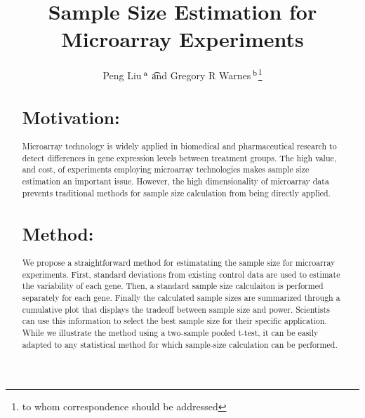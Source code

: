 \documentclass{bioinfo}
\begin{document}

\title{Sample Size Estimation for Microarray Experiments} 
\author{
  Peng Liu\,$^{\rm a}$ \t 
  and
  Gregory R Warnes\,$^{\rm b}$\footnote{to whom correspondence should
    be addressed}
}
\address{
  $^{\rm a}$Department of Biological Statistics and Computational
  Biology, Cornell University, Ithaca, NY 14853 \\
  $^{\rm b}$Nonclinical Statistics, Pfizer Global Research and Development, 
  Groton, CT 06340
}

\maketitle

\begin{abstract}

\section{Motivation:}
Microarray technology is widely applied in biomedical and
pharmaceutical research to detect differences in gene expression
levels between treatment groups.  The high value, and cost, of
experiments employing microarray technologies makes sample size
estimation an important issue.  However, the high dimensionality of
microarray data prevents traditional methods for sample size
calculation from being directly applied.

\section{Method:}
We propose a straightforward method for estimatating the sample size
for microarray experiments. First, standard deviations from existing
control data are used to estimate the variability of each gene. Then,
a standard sample size calculaiton is performed separately for each
gene.  Finally the calculated sample sizes are summarized through a
cumulative plot that displays the tradeoff between sample size and
power.  Scientists can use this information to select the best sample
size for their specific application.  While we illustrate the method
using a two-sample pooled t-test, it can be easily adapted to any
statistical method for which sample-size calculation can be performed.


\end{abstract}
\end{document}

